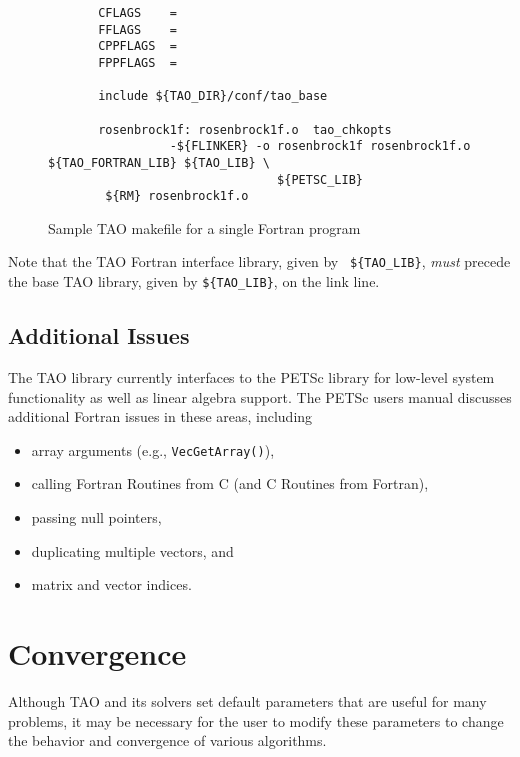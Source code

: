 \begin{figure}[tbh]
{\footnotesize
\begin{verbatim}   
       CFLAGS    = 
       FFLAGS    = 
       CPPFLAGS  =
       FPPFLAGS  =
       
       include ${TAO_DIR}/conf/tao_base
   
       rosenbrock1f: rosenbrock1f.o  tao_chkopts
                 -${FLINKER} -o rosenbrock1f rosenbrock1f.o ${TAO_FORTRAN_LIB} ${TAO_LIB} \
                                ${PETSC_LIB}
        ${RM} rosenbrock1f.o
\end{verbatim} %
\noindent
}
\caption{Sample TAO makefile for a single Fortran program}
\label{fig:make4}
\end{figure}

\noindent
Note that the TAO Fortran interface library, given by {\tt
\$\{TAO\_LIB\}}, {\em must}  precede
the base TAO library, given by {\tt \$\{TAO\_LIB\}}, 
on the link line.

\subsection{Additional Issues}

The TAO library currently interfaces to the PETSc library for
low-level system functionality as well as linear algebra support.  The
PETSc users manual discusses additional Fortran issues in these areas,
including
\begin{itemize}
\item array arguments (e.g., {\tt VecGetArray()}),
\item calling Fortran Routines from C (and C Routines from Fortran),
\item passing null pointers,
\item duplicating multiple vectors, and
\item matrix and vector indices.
\end{itemize}




\section{Convergence}\label{sec:customize}

Although TAO and its solvers set default parameters 
that are useful
for many problems, it may be necessary for the user to modify these
parameters to change the behavior and convergence of various algorithms.

